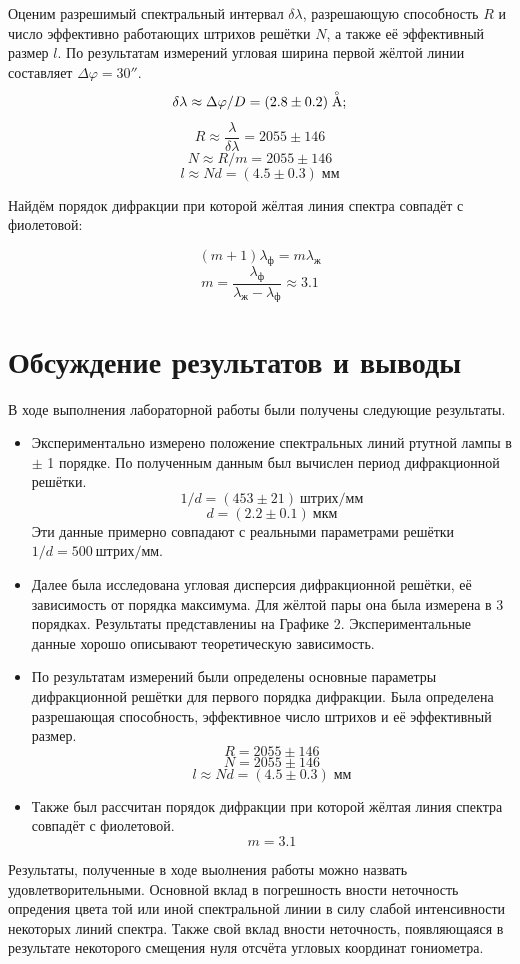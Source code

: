 \documentclass[a4paper,12pt]{article} %
\begin{document}
		Оценим разрешимый спектральный интервал $ \delta\lambda $, разрешающую способность $ R $ и число эффективно работающих штрихов решётки $ N $, а также её эффективный размер $ l $. По результатам измерений угловая ширина первой жёлтой линии составляет $\Delta\varphi = 30''$.
		\begin{equation}
			\delta\lambda \approx \Delta\varphi/D = (2.8 \pm 0.2) \buildrel _{\circ} \over {\mathrm{A}};
		\end{equation}
		\begin{equation}
			R \approx \frac{\lambda}{\delta\lambda} = 2055 \pm 146 
		\end{equation}
		\begin{equation}
			N \approx R/m = 2055 \pm 146
		\end{equation}
		\begin{equation}
			l \approx Nd = (4.5 \pm 0.3)\; \text{мм}
		\end{equation}
		
Найдём порядок дифракции при которой жёлтая линия спектра совпадёт с фиолетовой:

\[(m+1)\lambda_\text{ф}=m\lambda_\text{ж}\]
\[m=\frac{\lambda_\text{ф}}{\lambda_\text{ж}-\lambda_\text{ф}}\approx3.1\]

\section{Обсуждение результатов и выводы}
В ходе выполнения лабораторной работы были получены следующие результаты.
\begin{itemize}
    \item Экспериментально измерено положение спектральных линий ртутной лампы в $\pm$ 1 порядке. По полученным данным был вычислен период дифракционной решётки.
    \[1/d=(453\pm 21) \ \text{штрих/мм}\]
    \[\boxed{d = (2.2\pm 0.1) \ \text{мкм}}\]
    Эти данные примерно совпадают с реальными параметрами решётки $1/d = 500\ \text{штрих/мм}$.
    \item Далее была исследована угловая дисперсия дифракционной решётки, её зависимость от порядка максимума. Для жёлтой пары она была измерена в 3 порядках. Результаты представлениы на Графике 2. Экспериментальные данные хорошо описывают теоретическую зависимость.
    \item По результатам измерений были определены основные параметры дифракционной решётки для первого порядка дифракции. Была определена разрешающая способность, эффективное число штрихов и её эффективный размер.
    \[\boxed{R = 2055 \pm 146}\]
    \[\boxed{N = 2055 \pm 146}\]
    \[\boxed{l \approx Nd = (4.5 \pm 0.3)\; \text{мм}}\]
    \item Также был рассчитан порядок дифракции при которой жёлтая линия спектра совпадёт с фиолетовой.
    \[\boxed{m=3.1}\]
\end{itemize}

Результаты, полученные в ходе выолнения работы можно назвать удовлетворительными. Основной вклад в погрешность вности неточность опредения цвета той или иной спектральной линии в силу слабой интенсивности некоторых линий спектра. Также свой вклад вности неточность, появляющаяся в результате некоторого смещения нуля отсчёта угловых координат гониометра.
\end{document}
